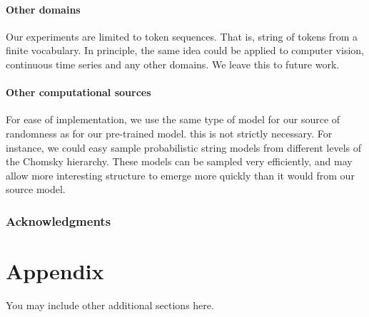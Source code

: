 \documentclass{article} %
\begin{document}
\paragraph{Other domains} Our experiments are limited to token sequences. That is, string of tokens from a finite vocabulary. In principle, the same idea could be applied to computer vision, continuous time series and any other domains. We leave this to future work.

\paragraph{Other computational sources} For ease of implementation, we use the same type of model for our source of randomness as for our pre-trained model. this is not strictly necessary. For instance, we could easy sample probabilistic string models from different levels of the Chomsky hierarchy. These models can be sampled very efficiently, and may allow more interesting structure to emerge more quickly than it would from our source model.

\subsubsection*{Acknowledgments}





\appendix
\section{Appendix}
You may include other additional sections here.
\end{document}
